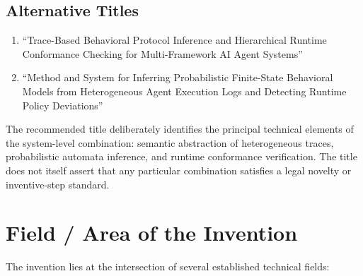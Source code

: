 \documentclass[11pt,a4paper]{article}
\begin{document}
\subsection*{Alternative Titles}

\begin{enumerate}[label=(\alph*)]
\item ``Trace-Based Behavioral Protocol Inference and Hierarchical Runtime Conformance
Checking for Multi-Framework AI Agent Systems''
\item ``Method and System for Inferring Probabilistic Finite-State Behavioral Models from
Heterogeneous Agent Execution Logs and Detecting Runtime Policy Deviations''
\end{enumerate}

The recommended title deliberately identifies the principal technical elements of the
system-level combination: semantic abstraction of heterogeneous traces, probabilistic
automata inference, and runtime conformance verification. The title does not itself
assert that any particular combination satisfies a legal novelty or inventive-step
standard.

\section{Field / Area of the Invention}

The invention lies at the intersection of several established technical fields:
\end{document}
